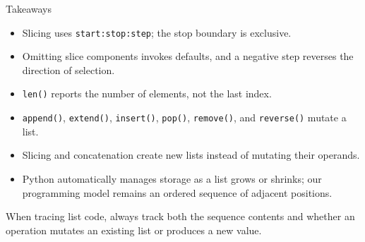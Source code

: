 \documentclass[aspectratio=169,10pt]{beamer}
\begin{document}
\begin{frame}{Takeaways}
  \begin{itemize}
    \item Slicing uses \texttt{start:stop:step}; the stop boundary is exclusive.
    \item Omitting slice components invokes defaults, and a negative step reverses the direction of selection.
    \item \texttt{len()} reports the number of elements, not the last index.
    \item \texttt{append()}, \texttt{extend()}, \texttt{insert()}, \texttt{pop()}, \texttt{remove()}, and \texttt{reverse()} mutate a list.
    \item Slicing and concatenation create new lists instead of mutating their operands.
    \item Python automatically manages storage as a list grows or shrinks; our programming model remains an ordered sequence of adjacent positions.
  \end{itemize}

  \begin{keyidea}
    When tracing list code, always track both the sequence contents and whether an operation mutates an existing list or produces a new value.
  \end{keyidea}
\end{frame}
\end{document}
